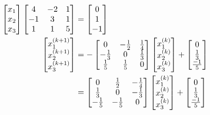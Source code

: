 		\begin{align}
			\begin{bmatrix}
				x_{1} \\
				x_{2} \\
				x_{3}
			\end{bmatrix}
			\begin{bmatrix}
				4 & -2 & 1 \\
				-1 & 3 & 1 \\
				1 & 1 & 5
			\end{bmatrix}
			&=
			\begin{bmatrix}
				0 \\
				1 \\
				-1
			\end{bmatrix}& \notag \\
			\begin{bmatrix}
				x_{1}^{(k+1)} \\
				x_{2}^{(k+1)} \\
				x_{3}^{(k+1)}
			\end{bmatrix}
			&=
			-
			\begin{bmatrix}
				0 & -\frac{1}{2} & \frac{1}{4} \\
				-\frac{1}{3} & 0 & \frac{1}{3} \\
				\frac{1}{5} & \frac{1}{5} & 0
			\end{bmatrix}
			\begin{bmatrix}
				x_{1}^{(k)} \\
				x_{2}^{(k)} \\
				x_{3}^{(k)}
			\end{bmatrix}
			+
			\begin{bmatrix}
				0 \\
				\frac{1}{3} \\
				\frac{-1}{5}
			\end{bmatrix}& \notag \\
			&=
			\begin{bmatrix}
				0 & \frac{1}{2} & -\frac{1}{4} \\
				\frac{1}{3} & 0 & -\frac{1}{3} \\
				-\frac{1}{5} & -\frac{1}{5} & 0
			\end{bmatrix}
			\begin{bmatrix}
				x_{1}^{(k)} \\
				x_{2}^{(k)} \\
				x_{3}^{(k)}
			\end{bmatrix}
			+
			\begin{bmatrix}
				0 \\
				\frac{1}{3} \\
				\frac{-1}{5}
			\end{bmatrix}&
		\end{align}

